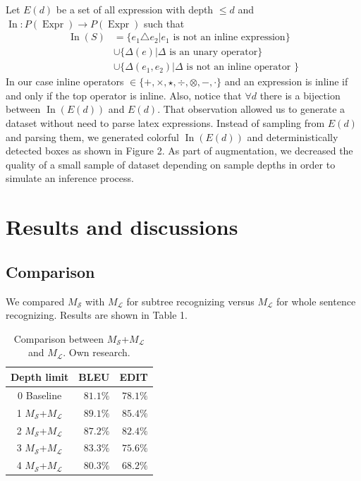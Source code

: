 \documentclass{sciposter}
\begin{document}
\begin{multicols}{3}
Let $E(d)$ be a set of all expression with depth $\le d$ and $\operatorname{In}: P(\operatorname{Expr}) \rightarrow P(\operatorname{Expr})$ such that
\nonumber
\begin{equation}
\begin{split}
\operatorname{In}(S) & = \{ e_1 \triangle e_2 | e_1 \text{ is not an inline expression} \} \\
& \cup  \{\Delta(e) | \Delta \text{ is an unary operator} \} \\
& \cup  \{\Delta(e_1,e_2) | \Delta \text{ is not an inline operator }\}
\end{split}
\end{equation}
In our case inline operators $\in \{+, \times, \star, \div, \otimes, -, \cdot \}$ and an expression is inline if and only if the top operator is inline. Also, notice that $\forall d$ there is a bijection between $\operatorname{In}\left(E(d)\right)$ and $E(d)$. That observation allowed us to generate a dataset without need to parse latex expressions. Instead of sampling from $E(d)$ and parsing them, we generated colorful $\operatorname{In}\left(E(d)\right)$ and deterministically detected boxes as shown in Figure 2. As part of augmentation, we decreased the quality of a small sample of dataset depending on sample depths in order to simulate an inference process.

\section{Results and discussions}

\subsection{Comparison}
We compared $M_{\mathcal{S}}$ with $M_{\mathcal{L}}$ for subtree recognizing versus $M_{\mathcal{L}}$ for whole sentence recognizing. Results are shown in Table 1.

\begin{table}[ht] 
\caption{Comparison between $M_{\mathcal{S}}$+$M_{\mathcal{L}}$ and $M_{\mathcal{L}}$.  Own research.} %
\centering %
\begin{tabular}{c| rr  } %
\hline\hline %
Depth limit &BLEU&EDIT\\ [0.25ex] 
\hline   
0 Baseline & $81.1\%$ & $78.1\%$  \\  
1 $M_{\mathcal{S}}$+$M_{\mathcal{L}}$ & $\bm{89.1\%}$ & $\bm{85.4\%}$  \\
2 $M_{\mathcal{S}}$+$M_{\mathcal{L}}$ & $\bm{87.2\%}$ & $\bm{82.4\%}$  \\  
3 $M_{\mathcal{S}}$+$M_{\mathcal{L}}$ & $\bm{83.3\%}$ & $75.6\%$  \\  
4 $M_{\mathcal{S}}$+$M_{\mathcal{L}}$ & $80.3\%$ & $68.2\%$  \\  


\end{tabular}
\end{table}
\end{multicols}
\end{document}
